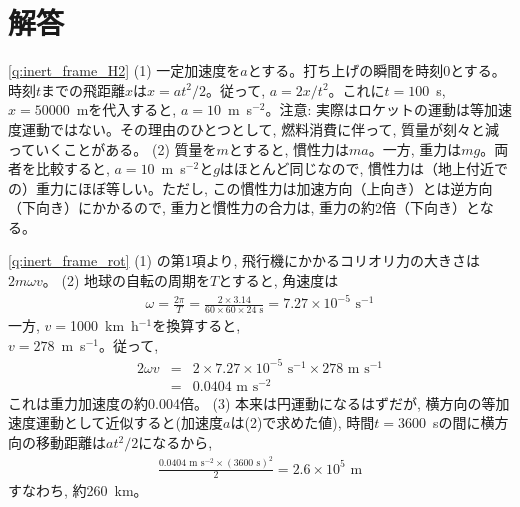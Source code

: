 \section{解答}
\ref{q:inert_frame_H2} 
(1) 一定加速度を$a$とする。打ち上げの瞬間を時刻0とする。時刻$t$までの飛距離$x$は$x=at^2/2$。従って, 
$a=2x/t^2$。これに$t=100$~s, $x=50000$~mを代入すると, $a=10$~m~s$^{-2}$。注意: 実際はロケットの運動は等加速度運動ではない。その理由のひとつとして, 燃料消費に伴って, 質量が刻々と減っていくことがある。
(2) 質量を$m$とすると, 慣性力は$ma$。一方, 重力は$mg$。両者を比較すると, $a=10$~m~s$^{-2}$と$g$はほとんど同じなので, 慣性力は（地上付近での）重力にほぼ等しい。ただし, この慣性力は加速方向（上向き）とは逆方向（下向き）にかかるので, 重力と慣性力の合力は, 重力の約2倍（下向き）となる。
\vspace{0.2cm}

\ref{q:inert_frame_rot} 
(1) の第1項より, 飛行機にかかるコリオリ力の大きさは$2m\omega v$。
(2) 地球の自転の周期を$T$とすると, 角速度は
\begin{eqnarray*}\omega=\frac{2\pi}{T}=\frac{2\times3.14}{60\times60\times24\text{ s}}=7.27\times10^{-5}\text{ s}^{-1}
\end{eqnarray*}
一方, $v=$1000~km~h$^{-1}$を換算すると, \\$v=278$~m~s$^{-1}$。従って, 
\begin{eqnarray*}
2\omega v&=&2\times7.27\times10^{-5}\text{ s}^{-1}\times278\text{ m s}^{-1}\\
          &=&0.0404\text{ m s}^{-2}
\end{eqnarray*}
これは重力加速度の約0.004倍。
(3) 本来は円運動になるはずだが, 横方向の等加速度運動として近似すると(加速度$a$は(2)で求めた値), 
時間$t=3600$~sの間に横方向の移動距離は$at^2/2$になるから, 
\begin{eqnarray*}
\frac{0.0404\text{ m s}^{-2}\times (3600 \text{ s})^2}{2}=2.6\times10^5\text{ m}
\end{eqnarray*}
すなわち, 約260~km。

